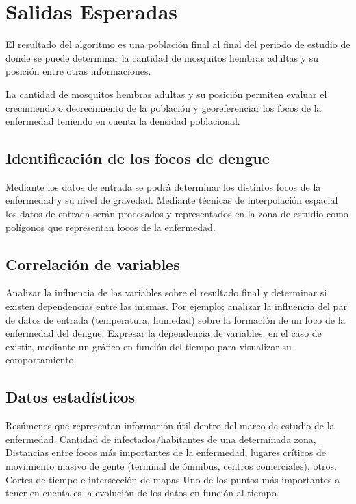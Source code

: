 \section{Salidas Esperadas}
\label{sec:solucion-salidas}

El resultado del algoritmo es una población final al final del periodo de estudio
de donde se puede determinar la cantidad de mosquitos hembras adultas y su posición entre otras informaciones.

La cantidad de mosquitos hembras adultas y su posición permiten evaluar el crecimiendo o decrecimiento de la población y georeferenciar los focos de la enfermedad teniendo en cuenta la densidad poblacional.

\subsection{Identificación de los focos de dengue}
Mediante los datos de entrada se podrá determinar los distintos focos de la enfermedad y su nivel de gravedad. Mediante técnicas de interpolación espacial los datos de entrada serán procesados y representados en la zona de estudio como polígonos que representan focos de la enfermedad.

\subsection{Correlación de variables}
Analizar la influencia de las variables sobre el resultado final y determinar si existen dependencias entre las mismas. Por ejemplo; analizar la influencia del par de datos de entrada (temperatura, humedad) sobre la formación de un foco de la enfermedad del dengue. Expresar la dependencia de variables, en el caso de existir, mediante un gráfico en función del tiempo para visualizar su comportamiento.

\subsection{Datos estadísticos}
Resúmenes que representan información útil dentro del marco de estudio de la enfermedad. Cantidad de infectados/habitantes de una determinada zona, Distancias entre focos más importantes de la enfermedad, lugares críticos de movimiento masivo de gente (terminal de ómnibus, centros comerciales), otros.
Cortes de tiempo e intersección de mapas
Uno de los puntos más importantes a tener en  cuenta es la evolución de los datos en función al tiempo.

